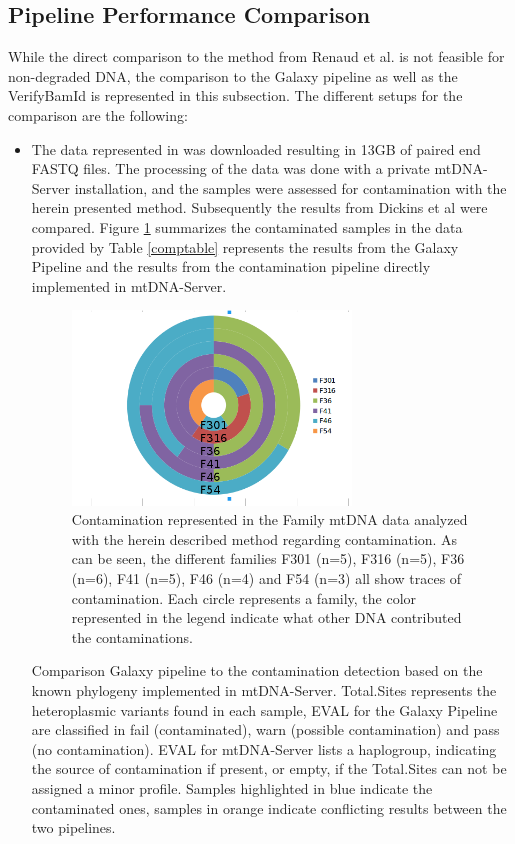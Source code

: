 \subsection{Pipeline Performance Comparison}
While the direct comparison to the method from Renaud et al. \cite{Renaud2015} is not feasible for non-degraded DNA, the comparison to the Galaxy pipeline \cite{Dickins2014} as well as the VerifyBamId \cite{Flickinger2015} is represented in this subsection. The different setups for the comparison are the following: 
\begin{itemize}
\item The data represented in \cite{Dickins2014} was downloaded resulting in 13GB of paired end FASTQ files. The processing of the data was done with a private mtDNA-Server installation, and the samples were assessed for contamination with the herein presented method. Subsequently the results from Dickins et al were compared. Figure \ref{cont:family} summarizes the contaminated samples in the data provided by Table \ref{comptable} represents the results from the Galaxy Pipeline and the results from the contamination pipeline directly implemented in mtDNA-Server.
\begin{figure}[!ht]
    \centering
    \includegraphics[width=0.7\textwidth]{images/families.png}
    \caption[Contamination represented in the Family mtDNA data]{Contamination represented in the Family mtDNA data  \cite{Dickins2014} analyzed with the herein described method regarding contamination. As can be seen, the different families F301 (n=5), F316 (n=5), F36 (n=6), F41 (n=5), F46 (n=4) and F54 (n=3) all show traces of contamination. Each circle represents a family, the color represented in the legend indicate what other DNA contributed the contaminations.} 
    \label{cont:family}
\end{figure}
\begin{table}[]
\centering
\caption{Comparison Galaxy pipeline to the contamination detection based on the known phylogeny implemented in mtDNA-Server. Total.Sites represents the heteroplasmic variants found in each sample, EVAL for the Galaxy Pipeline are classified in fail (contaminated), warn (possible contamination) and pass (no contamination). EVAL for mtDNA-Server lists a haplogroup, indicating the source of contamination if present, or empty, if the Total.Sites can not be assigned a minor profile. Samples highlighted in blue indicate the contaminated ones, samples in orange indicate conflicting results between the two pipelines.}

\end{table}
\end{itemize}
